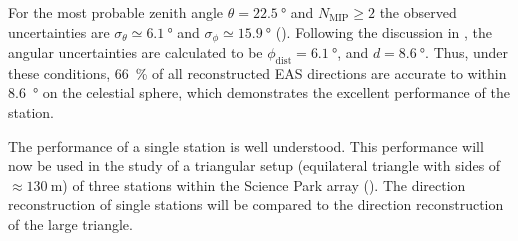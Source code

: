 For the most probable zenith angle $\theta = \SI{22.5}{\degree}$ and
$N_\mathrm{MIP} \geq 2$ the observed uncertainties are $\sigma_\theta \simeq
\SI{6.1}{\degree}$ and $\sigma_\phi \simeq \SI{15.9}{\degree}$
().
Following the discussion in , the angular
uncertainties are calculated to be $\phi_\mathrm{dist} = \SI{6.1}{\degree}$, and
$d = \SI{8.6}{\degree}$.
Thus, under these conditions, \SI{66}{\percent} of all reconstructed EAS
directions are accurate to within \SI{8.6}{\degree} on the celestial sphere,
which demonstrates the excellent performance of the \hisparc station.

The performance of a single \hisparc station is well understood. This
performance will now be used in the study of a triangular setup (equilateral
triangle with sides of $\approx \SI{130}{\meter}$) of three stations within the
Science Park array (). The direction reconstruction of
single stations will be compared to the direction reconstruction of the large
triangle.
